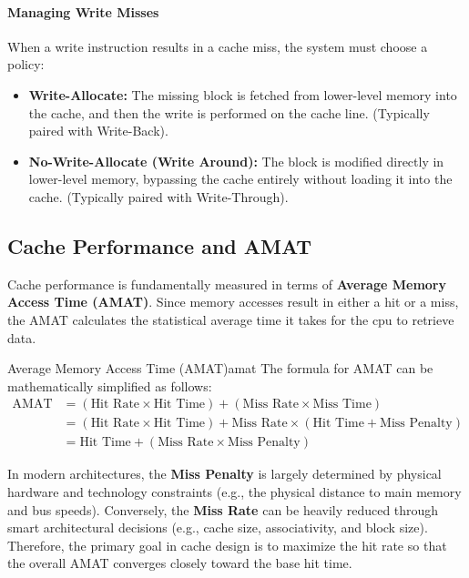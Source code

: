 \paragraph{Managing Write Misses}
When a write instruction results in a cache miss, the system must choose a policy:
\begin{itemize}
    \item \textbf{Write-Allocate:} The missing block is fetched from lower-level memory into the cache, and then the write is performed on the cache line. (Typically paired with Write-Back).
    \item \textbf{No-Write-Allocate (Write Around):} The block is modified directly in lower-level memory, bypassing the cache entirely without loading it into the cache. (Typically paired with Write-Through).
\end{itemize}

\subsection{Cache Performance and AMAT}
Cache performance is fundamentally measured in terms of \textbf{Average Memory Access Time (AMAT)}. Since memory accesses result in either a hit or a miss, the AMAT calculates the statistical average time it takes for the \gls{cpu} to retrieve data.

\begin{concept}{Average Memory Access Time (AMAT)}{amat}
    The formula for AMAT can be mathematically simplified as follows:
    \begin{align*}
        \text{AMAT} &= (\text{Hit Rate} \times \text{Hit Time}) + (\text{Miss Rate} \times \text{Miss Time}) \\
        &= (\text{Hit Rate} \times \text{Hit Time}) + \text{Miss Rate} \times (\text{Hit Time} + \text{Miss Penalty}) \\
        &= \text{Hit Time} + (\text{Miss Rate} \times \text{Miss Penalty})
    \end{align*}
\end{concept}

\noindent In modern architectures, the \textbf{Miss Penalty} is largely determined by physical hardware and technology constraints (e.g., the physical distance to main memory and bus speeds). Conversely, the \textbf{Miss Rate} can be heavily reduced through smart architectural decisions (e.g., cache size, associativity, and block size). Therefore, the primary goal in cache design is to maximize the hit rate so that the overall AMAT converges closely toward the base hit time.

